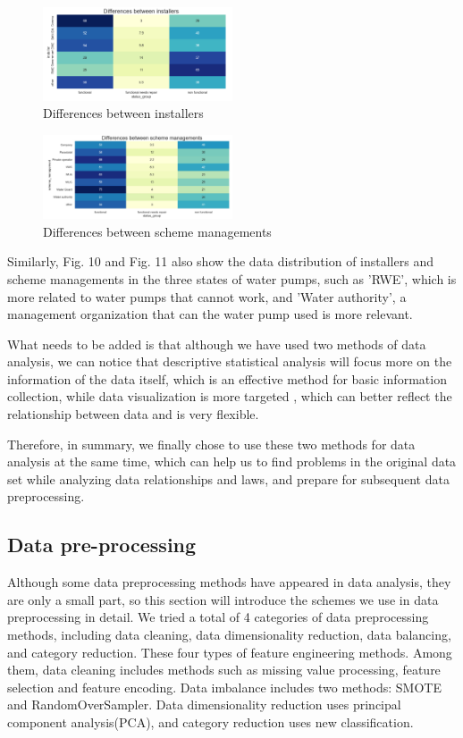 \documentclass[conference]{IEEEtran}
\begin{document}
\begin{figure}[H]
\centerline{\includegraphics[width=0.5\textwidth]{8.pic.jpg}}
\caption{Differences between installers}
\end{figure}
    
\begin{figure}[H]
\centerline{\includegraphics[width=0.5\textwidth]{9.pic.jpg}}
\caption{Differences between scheme managements}
\end{figure}

Similarly, Fig. 10 and Fig. 11 also show the data distribution of installers and scheme managements in the three states of water pumps, such as 'RWE', which is more related to water pumps that cannot work, and 'Water authority', a management organization that can the water pump used is more relevant.

What needs to be added is that although we have used two methods of data analysis, we can notice that descriptive statistical analysis will focus more on the information of the data itself, which is an effective method for basic information collection, while data visualization is more targeted , which can better reflect the relationship between data and is very flexible.

Therefore, in summary, we finally chose to use these two methods for data analysis at the same time, which can help us to find problems in the original data set while analyzing data relationships and laws, and prepare for subsequent data preprocessing.

\subsection{Data pre-processing}

Although some data preprocessing methods have appeared in data analysis, they are only a small part, so this section will introduce the schemes we use in data preprocessing in detail. We tried a total of 4 categories of data preprocessing methods, including data cleaning, data dimensionality reduction, data balancing, and category reduction. These four types of feature engineering methods. Among them, data cleaning includes methods such as missing value processing, feature selection and feature encoding. Data imbalance includes two methods: SMOTE and RandomOverSampler. Data dimensionality reduction uses principal component analysis(PCA), and category reduction uses new classification.
\end{document}
